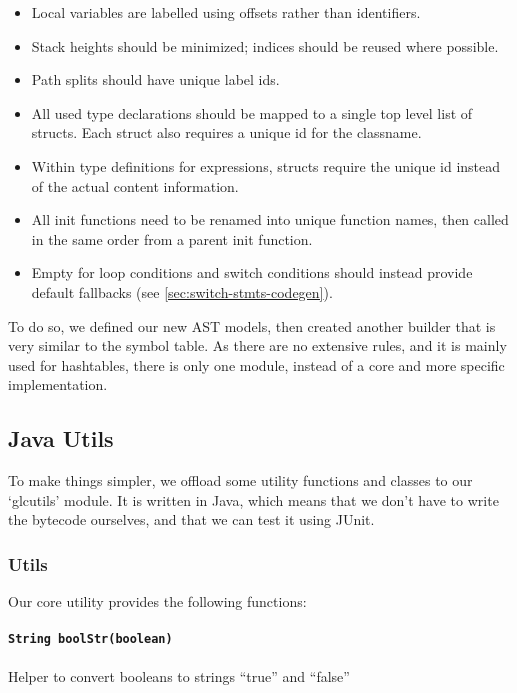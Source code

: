 \documentclass[11pt]{article}
\begin{document}
\begin{itemize}
	\item Local variables are labelled using offsets rather than identifiers. 
	\item Stack heights should be minimized; indices should be reused where possible.
	\item Path splits should have unique label ids.
	\item All used type declarations should be mapped to a single top level list of structs. Each struct also requires a unique id for the classname.
	\item Within type definitions for expressions, structs require the unique id instead of the actual content information.
	\item All init functions need to be renamed into unique function names, then called in the same order from a parent init function.
	\item Empty for loop conditions and switch conditions should instead provide default fallbacks (see \ref{sec:switch-stmts-codegen}).
\end{itemize}

To do so, we defined our new AST models, then created another builder that is very similar to the symbol table.
As there are no extensive rules, and it is mainly used for hashtables,
there is only one module, instead of a core and more specific implementation.

\subsection{Java Utils}

To make things simpler, we offload some utility functions and classes to our `glcutils' module. 
It is written in Java, which means that we don't have to write the bytecode ourselves, and that we can test it using JUnit.

\subsubsection{Utils}

Our core utility provides the following functions:

\paragraph{\texttt{String boolStr(boolean)}}

Helper to convert booleans to strings ``true'' and ``false''
\end{document}
